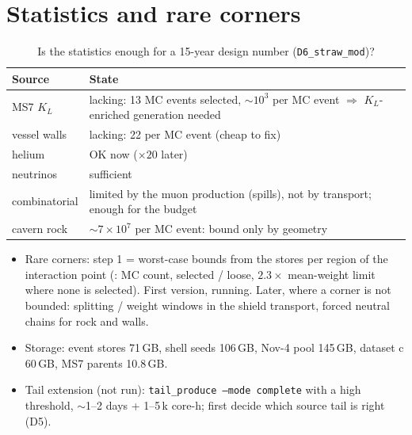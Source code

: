 \section{Statistics and rare corners}

\begin{table}[h]
\centering\small
\caption{Is the statistics enough for a 15-year design number (\texttt{D6\_straw\_mod})?
}
\begin{tabularx}{\linewidth}{@{}lX@{}}
\toprule
Source & State\\
\midrule
MS7 $K_L$ & lacking: 13 MC events selected, $\sim10^3$ per MC event $\Rightarrow$ $K_L$-enriched generation needed\\
vessel walls & lacking: 22 per MC event (cheap to fix)\\
helium & OK now ($\times20$ later)\\
neutrinos & sufficient\\
combinatorial & limited by the muon production (spills), not by transport; enough for the budget\\
cavern rock & $\sim7\times10^7$ per MC event: bound only by geometry\\
\bottomrule
\end{tabularx}
\end{table}

\begin{itemize}
\item Rare corners: step 1 = worst-case bounds from the stores per region of the interaction point
(: MC count, selected / loose, $2.3\times$ mean-weight limit where none is selected).
First version, running. Later, where a corner is not bounded: splitting / weight windows in the shield transport,
forced neutral chains for rock and walls.
\item Storage: event stores 71\,GB, shell seeds 106\,GB, Nov-4 pool 145\,GB, dataset c 60\,GB, MS7 parents 10.8\,GB.
\item Tail extension (not run): \texttt{tail\_produce --mode complete} with a high threshold, $\sim$1--2 days + 1--5\,k
core-h; first decide which source tail is right (D5).
\end{itemize}

